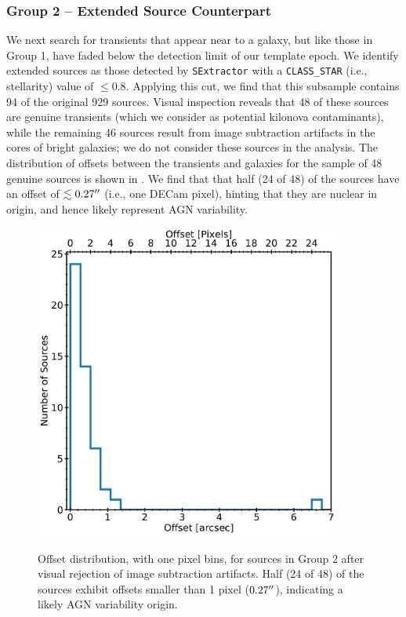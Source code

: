 \subsubsection{Group 2 -- Extended Source Counterpart}
\label{sec:ch3_group2}
We next search for transients that appear near to a galaxy, but like those in Group 1, have faded below the detection limit of our template epoch. We identify extended sources as those detected by {\tt SExtractor} with a {\tt CLASS\_STAR} (i.e., stellarity) value of $\le 0.8$. Applying this cut, we find that this subsample contains 94 of the original 929 sources. Visual inspection reveals that 48 of these sources are genuine transients (which we consider as potential kilonova contaminants), while the remaining 46 sources result from image subtraction artifacts in the cores of bright galaxies; we do not consider these sources in the analysis. The distribution of offsets between the transients and galaxies for the sample of 48 genuine sources is shown in . We find that that half (24 of 48) of the sources have an offset of $\lesssim 0.27\hbox{$^{\prime\prime}$}$ (i.e., one DECam pixel), hinting that they are nuclear in origin, and hence likely represent AGN variability.

\begin{figure}[!t]
\begin{center}
\hspace*{-0.1in}
\scalebox{1.}
{\includegraphics[width=0.9\textwidth]{./figs/chapter3/f1.pdf}}
\caption{\singlespace Offset distribution, with one pixel bins, for sources in Group 2 after visual rejection of image subtraction artifacts. Half (24 of 48) of the sources exhibit offsets smaller than 1 pixel ($0.27\hbox{$^{\prime\prime}$}$), indicating a likely AGN variability origin.}
\label{fig:ch3_offset_hist}
\end{center}
\end{figure}

